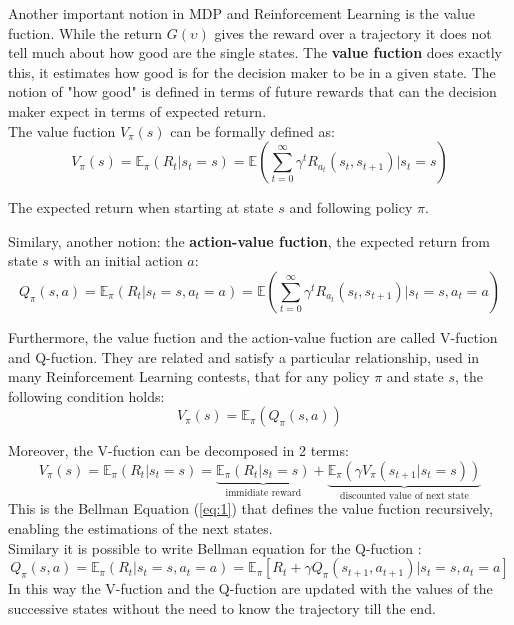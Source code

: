 \documentclass[14pt]{extarticle}
\def\ppn{\vspace{10pt}}
\begin{document}
\begin{flushleft}
\ppn
Another important notion in MDP and Reinforcement Learning is the value fuction. While the return $G(\upsilon)$ gives the reward over a trajectory it does not tell much about how good are the single states. The \textbf{value fuction} does exactly this, it estimates how good is for the decision maker to be in a given state. The notion of "how good" is defined in terms of future rewards that can the decision maker expect in terms of expected return.
\\
The value fuction $V_{\pi}(s)$ can be formally defined as: 
\[V_{\pi}(s) = \mathbb{E}_{\pi}(R_t|s_t=s) = \mathbb{E}(\sum_{t=0}^{\infty} \gamma^t R_{a_t}(s_t, s_{t+1})|s_t=s)\]
\vspace{-9.3mm}
\begin{center}
The expected return when starting at state $s$ and following policy $\pi$.
\end{center}

Similary, another notion: the \textbf{action-value fuction}, the expected return from state $s$ with an initial action $a$:
\[Q_{\pi}(s,a) = \mathbb{E}_{\pi}(R_t|s_t=s, a_t=a) = \mathbb{E}(\sum_{t=0}^{\infty} \gamma^t R_{a_t}(s_t, s_{t+1})|s_t=s,a_t=a)\]

Furthermore, the value fuction and the action-value fuction are called V-fuction and Q-fuction. They are related and satisfy a particular relationship, used in many Reinforcement Learning contests, that for any policy $\pi$ and state $s$, the following condition holds:
\[V_{\pi}(s) = \mathbb{E}_{\pi}(Q_{\pi}(s,a))\]

\ppn
Moreover, the V-fuction can be decomposed in 2 terms:
\begin{equation} \label{eq:1}
V_{\pi}(s) = \mathbb{E}_{\pi}(R_t|s_t=s) = 
					\underbrace{\mathbb{E}_{\pi}(R_{t}|s_t=s)}_{\text{immidiate reward}} + 
					\underbrace{\mathbb{E}_{\pi}(\gamma V_{\pi}(s_{t+1}|s_t=s))}_{\text{discounted value of next state}}
\end{equation}
This is the Bellman Equation (\ref{eq:1}) that defines the value fuction recursively, enabling the estimations of the next states. \\
Similary it is possible to write Bellman equation for the Q-fuction :
\[Q_{\pi}(s,a) = \mathbb{E}_{\pi}(R_t|s_t=s, a_t=a) = \mathbb{E}_{\pi}[R_t + \gamma Q_{\pi}(s_{t+1},a_{t+1})| s_t=s, a_t=a] \]
In this way the V-fuction and the  Q-fuction are updated with the values of the successive states without the need to know the trajectory till the end.


\end{flushleft}
\end{document}
